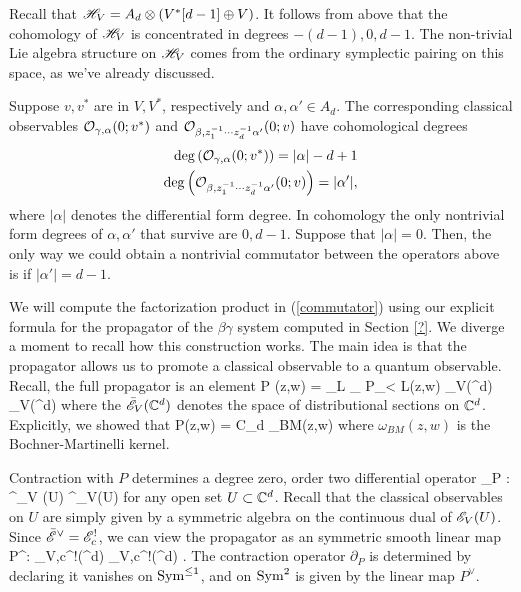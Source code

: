 \documentclass[10pt]{amsart}
\begin{document}
Recall that $\mathscr H_V = A_d \otimes (V^*[d-1] \oplus V)$.
It follows from above that the cohomology of $\mathscr H_V$ is concentrated in degrees $-(d-1), 0, d-1$. 
The non-trivial Lie algebra structure on $\mathscr H_V$ comes from the ordinary symplectic pairing on this space, as we've already discussed. 

Suppose $v,v^*$ are in $V,V^*$, respectively and $\alpha,\alpha' \in A_d$.
The corresponding classical observables $\mathcal O_{\gamma,\alpha}(0;v^*)$ and $\mathcal O_{\beta, z_1^{-1}\cdots z_d^{-1} \alpha'}(0;v)$ have cohomological degrees
\begin{align*}
{\rm deg}\left(\mathcal O_{\gamma,\alpha}(0;v^*)\right) = |\alpha| - d + 1 \\
{\rm deg}\left(\mathcal O_{\beta, z_1^{-1}\cdots z_d^{-1} \alpha'}(0;v)\right) = |\alpha'|,
\end{align*}
where $|\alpha|$ denotes the differential form degree.
In cohomology the only nontrivial form degrees of $\alpha,\alpha'$ that survive are $0,d-1$. 
Suppose that $|\alpha| = 0$.
Then, the only way we could obtain a nontrivial commutator between the operators above is if $|\alpha'| = d-1$. 

We will compute the factorization product in (\ref{commutator}) using our explicit formula for the propagator of the $\beta\gamma$ system computed in Section \ref{?}.
We diverge a moment to recall how this construction works.
The main idea is that the propagator allows us to promote a classical observable to a quantum observable.
Recall, the full propagator is an element
\ben 
P (z,w) = \lim_{L\to \infty} \lim_{\epsilon {}} P_{\epsilon < L}(z,w) \in \Bar{\sE}_V(\CC^d) \Hat{\tensor} \Bar{\sE}_V(\CC^d)
\een
where the $\Bar{\mathscr E}_V(\mathbb C^d)$ denotes the space of distributional sections on $\mathbb C^d$.
Explicitly, we showed that 
\ben
P(z,w) = C_d \;\omega_{BM}(z,w) 
\een
where $\omega_{BM}(z,w)$ is the Bochner-Martinelli kernel.

Contraction with $P$ determines a degree zero, order two differential operator
\ben
\partial_{P} : \Obs^{\cl}_V (U) \to \Obs^{\cl}_{V}(U)
\een
for any open set $U \subset \mathbb C^d$. 
Recall that the classical observables on $U$ are simply given by a symmetric algebra on the continuous dual of $\mathscr E_V(U)$. 
Since $\Bar{\mathscr E}^\vee = \mathscr E_c^!$, we can view the propagator as an symmetric smooth linear map
\ben
P^\vee : \sE_{V,c}^!(\CC^d) \Hat{\tensor} \sE_{V,c}^!(\CC^d) \to \CC .
\een
The contraction operator $\partial_P$ is determined by declaring it vanishes on ${\rm Sym}^{\leq 1}$, and on ${\rm Sym}^2$ is given by the linear map $P^\vee$. 
\end{document}
